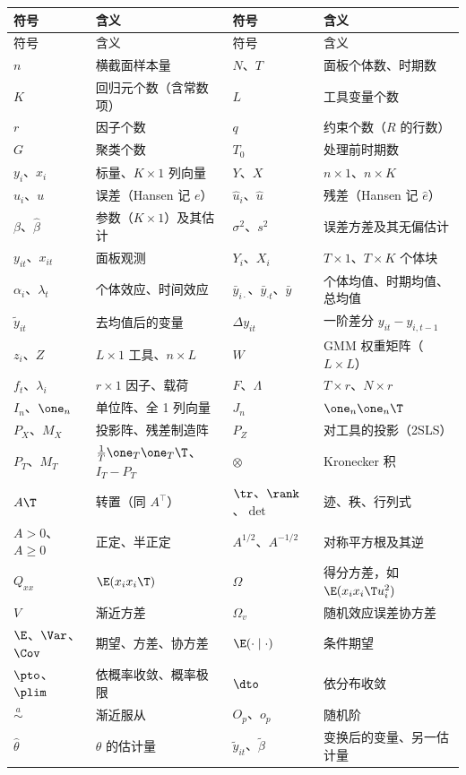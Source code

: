\begin{small}
\begin{longtable}{@{}p{2.4cm}p{4.9cm}p{2.4cm}p{4.9cm}@{}}
\toprule
符号 & 含义 & 符号 & 含义\\
\midrule
\endfirsthead
\toprule
符号 & 含义 & 符号 & 含义\\
\midrule
\endhead
\bottomrule
\endfoot
$n$ & 横截面样本量 & $N$、$T$ & 面板个体数、时期数\\
$K$ & 回归元个数（含常数项） & $L$ & 工具变量个数\\
$r$ & 因子个数 & $q$ & 约束个数（$R$ 的行数）\\
$G$ & 聚类个数 & $T_0$ & 处理前时期数\\
$y_i$、$x_i$ & 标量、$K\times1$ 列向量 & $Y$、$X$ & $n\times1$、$n\times K$\\
$u_i$、$u$ & 误差（Hansen 记 $e$） & $\hat u_i$、$\hat u$ & 残差（Hansen 记 $\hat e$）\\
$\beta$、$\hat\beta$ & 参数（$K\times1$）及其估计 & $\sigma^2$、$s^2$ & 误差方差及其无偏估计\\
$y_{it}$、$x_{it}$ & 面板观测 & $Y_i$、$X_i$ & $T\times1$、$T\times K$ 个体块\\
$\alpha_i$、$\lambda_t$ & 个体效应、时间效应 & $\bar y_{i\cdot}$、$\bar y_{\cdot t}$、$\bar y$ & 个体均值、时期均值、总均值\\
$\tilde y_{it}$ & 去均值后的变量 & $\Delta y_{it}$ & 一阶差分 $y_{it}-y_{i,t-1}$\\
$z_i$、$Z$ & $L\times1$ 工具、$n\times L$ & $W$ & GMM 权重矩阵（$L\times L$）\\
$f_t$、$\lambda_i$ & $r\times1$ 因子、载荷 & $F$、$\Lambda$ & $T\times r$、$N\times r$\\
$I_n$、$\one_n$ & 单位阵、全 1 列向量 & $J_n$ & $\one_n\one_n\T$\\
$P_X$、$M_X$ & 投影阵、残差制造阵 & $P_Z$ & 对工具的投影（2SLS）\\
$P_T$、$M_T$ & $\frac1T\one_T\one_T\T$、$I_T-P_T$ & $\otimes$ & Kronecker 积\\
$A\T$ & 转置（同 $A^{\top}$） & $\tr$、$\rank$、$\det$ & 迹、秩、行列式\\
$A>0$、$A\ge0$ & 正定、半正定 & $A^{1/2}$、$A^{-1/2}$ & 对称平方根及其逆\\
$Q_{xx}$ & $\E(x_ix_i\T)$ & $\Omega$ & 得分方差，如 $\E(x_ix_i\T u_i^2)$\\
$V$ & 渐近方差 & $\Omega_v$ & 随机效应误差协方差\\
$\E$、$\Var$、$\Cov$ & 期望、方差、协方差 & $\E(\cdot\mid\cdot)$ & 条件期望\\
$\pto$、$\plim$ & 依概率收敛、概率极限 & $\dto$ & 依分布收敛\\
$\overset{a}{\sim}$ & 渐近服从 & $O_p$、$o_p$ & 随机阶\\
$\hat\theta$ & $\theta$ 的估计量 & $\tilde y_{it}$、$\tilde\beta$ & 变换后的变量、另一估计量\\
\end{longtable}
\end{small}

